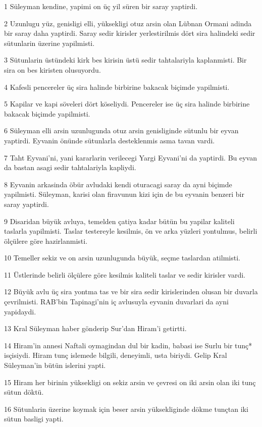 \par 1 Süleyman kendine, yapimi on üç yil süren bir saray yaptirdi.
\par 2 Uzunlugu yüz, genisligi elli, yüksekligi otuz arsin olan Lübnan Ormani adinda bir saray daha yaptirdi. Saray sedir kirisler yerlestirilmis dört sira halindeki sedir sütunlarin üzerine yapilmisti.
\par 3 Sütunlarin üstündeki kirk bes kirisin üstü sedir tahtalariyla kaplanmisti. Bir sira on bes kiristen olusuyordu.
\par 4 Kafesli pencereler üç sira halinde birbirine bakacak biçimde yapilmisti.
\par 5 Kapilar ve kapi söveleri dört köseliydi. Pencereler ise üç sira halinde birbirine bakacak biçimde yapilmisti.
\par 6 Süleyman elli arsin uzunlugunda otuz arsin genisliginde sütunlu bir eyvan yaptirdi. Eyvanin önünde sütunlarla desteklenmis asma tavan vardi.
\par 7 Taht Eyvani'ni, yani kararlarin verilecegi Yargi Eyvani'ni da yaptirdi. Bu eyvan da bastan asagi sedir tahtalariyla kapliydi.
\par 8 Eyvanin arkasinda öbür avludaki kendi oturacagi saray da ayni biçimde yapilmisti. Süleyman, karisi olan firavunun kizi için de bu eyvanin benzeri bir saray yaptirdi.
\par 9 Disaridan büyük avluya, temelden çatiya kadar bütün bu yapilar kaliteli taslarla yapilmisti. Taslar testereyle kesilmis, ön ve arka yüzleri yontulmus, belirli ölçülere göre hazirlanmisti.
\par 10 Temeller sekiz ve on arsin uzunlugunda büyük, seçme taslardan atilmisti.
\par 11 Üstlerinde belirli ölçülere göre kesilmis kaliteli taslar ve sedir kirisler vardi.
\par 12 Büyük avlu üç sira yontma tas ve bir sira sedir kirislerinden olusan bir duvarla çevrilmisti. RAB'bin Tapinagi'nin iç avlusuyla eyvanin duvarlari da ayni yapidaydi.
\par 13 Kral Süleyman haber gönderip Sur'dan Hiram'i getirtti.
\par 14 Hiram'in annesi Naftali oymagindan dul bir kadin, babasi ise Surlu bir tunç* isçisiydi. Hiram tunç islemede bilgili, deneyimli, usta biriydi. Gelip Kral Süleyman'in bütün islerini yapti.
\par 15 Hiram her birinin yüksekligi on sekiz arsin ve çevresi on iki arsin olan iki tunç sütun döktü.
\par 16 Sütunlarin üzerine koymak için beser arsin yüksekliginde dökme tunçtan iki sütun basligi yapti.
